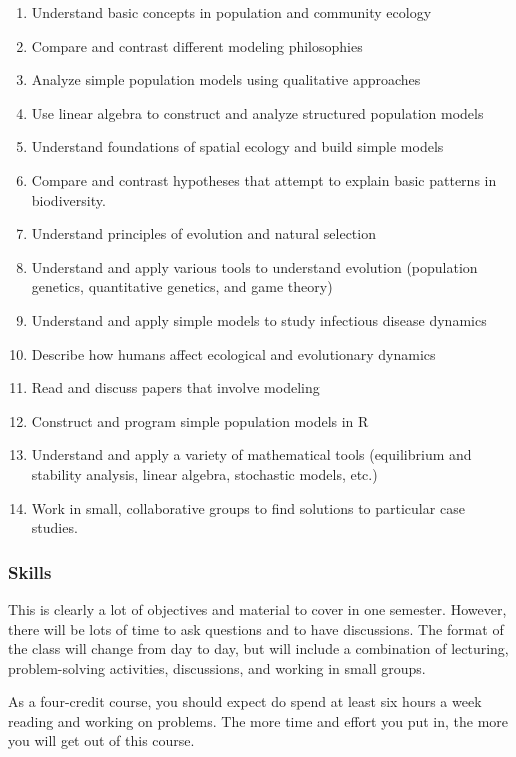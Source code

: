\documentclass[12pt,]{article}
\providecommand{\tightlist}{%
  \setlength{\itemsep}{0pt}\setlength{\parskip}{0pt}}
\begin{document}
\begin{enumerate}
\def\labelenumi{\arabic{enumi}.}
\tightlist
\item
  Understand basic concepts in population and community ecology
\item
  Compare and contrast different modeling philosophies
\item
  Analyze simple population models using qualitative approaches
\item
  Use linear algebra to construct and analyze structured population
  models
\item
  Understand foundations of spatial ecology and build simple models
\item
  Compare and contrast hypotheses that attempt to explain basic patterns
  in biodiversity.
\item
  Understand principles of evolution and natural selection
\item
  Understand and apply various tools to understand evolution (population
  genetics, quantitative genetics, and game theory)
\item
  Understand and apply simple models to study infectious disease
  dynamics
\item
  Describe how humans affect ecological and evolutionary dynamics
\item
  Read and discuss papers that involve modeling
\item
  Construct and program simple population models in R
\item
  Understand and apply a variety of mathematical tools (equilibrium and
  stability analysis, linear algebra, stochastic models, etc.)
\item
  Work in small, collaborative groups to find solutions to particular
  case studies.
\end{enumerate}

\subsubsection{Skills}\label{skills}

This is clearly a lot of objectives and material to cover in one
semester. However, there will be lots of time to ask questions and to
have discussions. The format of the class will change from day to day,
but will include a combination of lecturing, problem-solving activities,
discussions, and working in small groups.

As a four-credit course, you should expect do spend at least six hours a
week reading and working on problems. The more time and effort you put
in, the more you will get out of this course.
\end{document}
